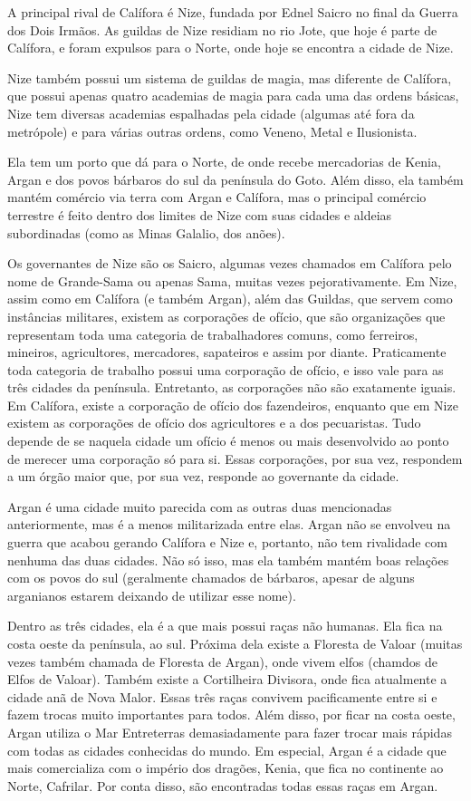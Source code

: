 \documentclass{RPG_Adventure}[2021/10/20]
\begin{document}
\begin{multicols}{2}
A principal rival de Calífora é Nize, fundada por Ednel Saicro no final da
Guerra dos Dois Irmãos. As guildas de Nize residiam no rio Jote, que hoje é
parte de Calífora, e foram expulsos para o Norte, onde hoje se encontra a cidade
de Nize.

Nize também possui um sistema de guildas de magia, mas diferente de Calífora,
que possui apenas quatro academias de magia para cada uma das ordens básicas,
Nize tem diversas academias espalhadas pela cidade (algumas até fora da
metrópole) e para várias outras ordens, como Veneno, Metal e Ilusionista.

Ela tem um porto que dá para o Norte, de onde recebe mercadorias de Kenia, Argan
e dos povos bárbaros do sul da península do Goto. Além disso, ela também mantém
comércio via terra com Argan e Calífora, mas o principal comércio terrestre é
feito dentro dos limites de Nize com suas cidades e aldeias subordinadas (como
as Minas Galalio, dos anões).

Os governantes de Nize são os Saicro, algumas vezes chamados em Calífora pelo
nome de Grande-Sama ou apenas Sama, muitas vezes pejorativamente. Em Nize, assim
como em Calífora (e também Argan), além das Guildas, que servem como instâncias
militares, existem as corporações de ofício, que são organizações que
representam toda uma categoria de trabalhadores comuns, como ferreiros,
mineiros, agricultores, mercadores, sapateiros e assim por diante. Praticamente
toda categoria de trabalho possui uma corporação de ofício, e isso vale para as
três cidades da península. Entretanto, as corporações não são exatamente iguais.
Em Calífora, existe a corporação de ofício dos fazendeiros, enquanto que em Nize
existem as corporações de ofício dos agricultores e a dos pecuaristas. Tudo
depende de se naquela cidade um ofício é menos ou mais desenvolvido ao ponto de
merecer uma corporação só para si. Essas corporações, por sua vez, respondem a
um órgão maior que, por sua vez, responde ao governante da cidade.

Argan é uma cidade muito parecida com as outras duas mencionadas anteriormente,
mas é a menos militarizada entre elas. Argan não se envolveu na guerra que
acabou gerando Calífora e Nize e, portanto, não tem rivalidade com nenhuma das
duas cidades. Não só isso, mas ela também mantém boas relações com os povos do
sul (geralmente chamados de bárbaros, apesar de alguns arganianos estarem
deixando de utilizar esse nome).

Dentro as três cidades, ela é a que mais possui raças não humanas. Ela fica na
costa oeste da península, ao sul. Próxima dela existe a Floresta de Valoar
(muitas vezes também chamada de Floresta de Argan), onde vivem elfos (chamdos de
Elfos de Valoar). Também existe a Cortilheira Divisora, onde fica atualmente a
cidade anã de Nova Malor. Essas três raças convivem pacificamente entre si e
fazem trocas muito importantes para todos. Além disso, por ficar na costa oeste,
Argan utiliza o Mar Entreterras demasiadamente para fazer trocar mais rápidas
com todas as cidades conhecidas do mundo. Em especial, Argan é a cidade que mais
comercializa com o império dos dragões, Kenia, que fica no continente ao Norte,
Cafrilar. Por conta disso, são encontradas todas essas raças em Argan.


\end{multicols}
\end{document}
